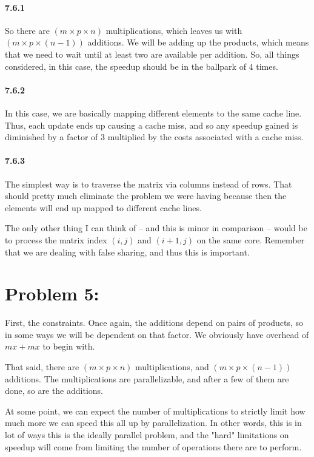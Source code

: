 \documentclass[a4paper]{article}
\begin{document}
\paragraph{7.6.1} So there are $(m \times p \times n)$ multiplications, which leaves us with $(m \times p \times (n-1))$ additions. We will be adding up the products, which means that we need to wait until at least two are available per addition. So, all things considered, in this case, the speedup should be in the ballpark of 4 times.

\paragraph{7.6.2} In this case, we are basically mapping different elements to the same cache line. Thus, each update ends up causing a cache miss, and so any speedup gained is diminished by a factor of 3 multiplied by the costs associated with a cache miss.

\paragraph{7.6.3} The simplest way is to traverse the matrix via columns instead of rows. That should pretty much eliminate the problem we were having because then the elements will end up mapped to different cache lines.

The only other thing I can think of -- and this is minor in comparison -- would be to process the matrix index $(i,j)$ and $(i+1,j)$ on the same core. Remember that we are dealing with false sharing, and thus this is important.

\section*{Problem 5:} First, the constraints. Once again, the additions depend on pairs of products, so in some ways we will be dependent on that factor. We obviously have overhead of $mx + mx$ to begin with.

That said, there are $(m \times p \times n)$ multiplications, and $(m \times p \times (n-1))$ additions. The multiplications are parallelizable, and after a few of them are done, so are the additions.

At some point, we can expect the number of multiplications to strictly limit how much more we can speed this all up by parallelization. In other words, this is in lot of ways this is the ideally parallel problem, and the "hard" limitations on speedup will come from limiting the number of operations there are to perform.
\end{document}
